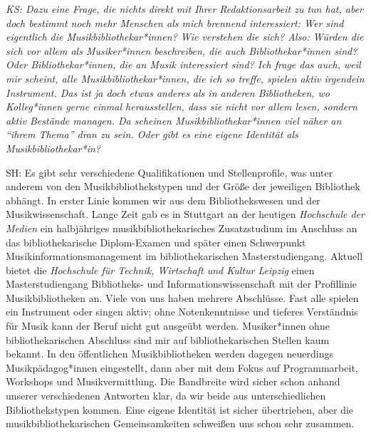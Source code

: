 \documentclass[a4paper,
fontsize=11pt,
oneside,
numbers=noperiodatend,
parskip=half-,
bibliography=totoc,
final
]{scrartcl}
\begin{document}
\emph{KS: Dazu eine Frage, die nichts direkt mit Ihrer Redaktionsarbeit
zu tun hat, aber doch bestimmt noch mehr Menschen als mich brennend
interessiert: Wer sind eigentlich die Musikbibliothekar*innen? Wie
verstehen die sich? Also: Würden die sich vor allem als Musiker*innen
beschreiben, die auch Bibliothekar*innen sind? Oder Bibliothekar*innen,
die an Musik interessiert sind? Ich frage das auch, weil mir scheint,
alle Musikbibliothekar*innen, die ich so treffe, spielen aktiv irgendein
Instrument. Das ist ja doch etwas anderes als in anderen Bibliotheken,
wo Kolleg*innen gerne einmal herausstellen, dass sie nicht vor allem
lesen, sondern aktiv Bestände managen. Da scheinen
Musikbibliothekar*innen viel näher an \enquote{ihrem Thema} dran zu
sein. Oder gibt es eine eigene Identität als Musikbibliothekar*in?}

SH: Es gibt sehr verschiedene Qualifikationen und Stellenprofile, was
unter anderem von den Musikbibliothekstypen und der Größe der jeweiligen
Bibliothek abhängt. In erster Linie kommen wir aus dem Bibliothekswesen
und der Musikwissenschaft. Lange Zeit gab es in Stuttgart an der
heutigen \emph{Hochschule der Medien} ein halbjähriges
musikbibliothekarisches Zusatzstudium im Anschluss an das
bibliothekarische Diplom-Examen und später einen Schwerpunkt
Musikinformationsmanagement im bibliothekarischen Masterstudiengang.
Aktuell bietet die \emph{Hochschule für Technik, Wirtschaft und Kultur
Leipzig} einen Masterstudiengang Bibliotheks- und
Informationswissenschaft mit der Profillinie Musikbibliotheken an. Viele
von uns haben mehrere Abschlüsse. Fast alle spielen ein Instrument oder
singen aktiv; ohne Notenkenntnisse und tieferes Verständnis für Musik
kann der Beruf nicht gut ausgeübt werden. Musiker*innen ohne
bibliothekarischen Abschluss sind mir auf bibliothekarischen Stellen
kaum bekannt. In den öffentlichen Musikbibliotheken werden dagegen
neuerdings Musikpädagog*innen eingestellt, dann aber mit dem Fokus auf
Programmarbeit, Workshops und Musikvermittlung. Die Bandbreite wird
sicher schon anhand unserer verschiedenen Antworten klar, da wir beide
aus unterschiedlichen Bibliothekstypen kommen. Eine eigene Identität ist
sicher übertrieben, aber die musikbibliothekarischen Gemeinsamkeiten
schweißen uns schon sehr zusammen.
\end{document}
